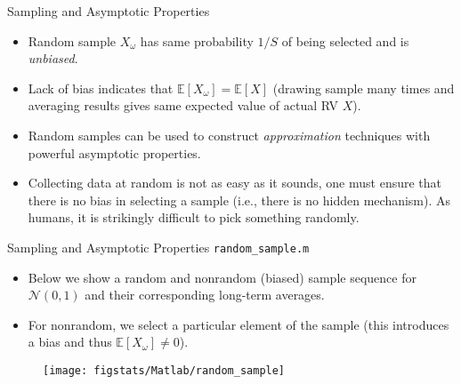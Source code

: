 \documentclass[9pt]{beamer}
\begin{document}
%
\begin{frame}{Sampling and Asymptotic Properties}

\begin{block}{}
\begin{itemize}
\setlength{\itemsep}{10pt}
\item Random sample $X_\omega$ has same probability $1/S$ of being selected and is {\em unbiased}. 

\item Lack of bias indicates that $\mathbb{E}[X_\omega]=\mathbb{E}[X]$ (drawing sample many times and averaging results gives same expected value of actual RV $X$). 

\item Random samples can be used to construct {\em approximation} techniques with powerful asymptotic properties.

\item Collecting data at random is not as easy as it sounds, one must ensure that there is no bias in selecting a sample (i.e., there is no hidden mechanism).  As humans, it is strikingly difficult to pick something randomly. 

\end{itemize}
\end{block}

\end{frame}

%
\begin{frame}{Sampling and Asymptotic Properties \footnotesize{\texttt{random\_sample.m}}}
\begin{itemize}
\item Below we show a random and nonrandom (biased) sample sequence for $\mathcal{N}(0,1)$ and their corresponding long-term  averages. 
\item For nonrandom, we select a particular element of the sample (this introduces a bias and thus $\mathbb{E}[X_\omega]\neq 0$). 
\end{itemize}
\begin{figure}[!htb]
    \centering
	\texttt{[image: figstats/Matlab/random\_sample]}
\end{figure}

\end{frame}
\end{document}
